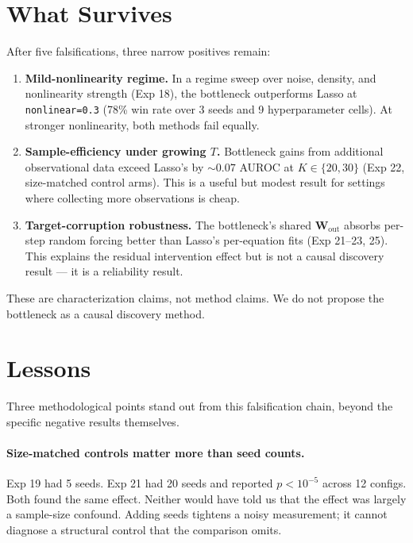 \documentclass{article}
\begin{document}
\section{What Survives}
\label{sec:survives}

After five falsifications, three narrow positives remain:

\begin{enumerate}[leftmargin=1.5em, topsep=0pt, itemsep=0pt]
  \item \textbf{Mild-nonlinearity regime.} In a regime sweep over
  noise, density, and nonlinearity strength (Exp 18), the bottleneck
  outperforms Lasso at \texttt{nonlinear=0.3} (78\% win rate over 3
  seeds and 9 hyperparameter cells). At stronger nonlinearity,
  both methods fail equally.
  \item \textbf{Sample-efficiency under growing $T$.} Bottleneck
  gains from additional observational data exceed Lasso's by
  $\sim 0.07$ AUROC at $K \in \{20, 30\}$ (Exp 22, size-matched
  control arms). This is a useful but modest result for settings
  where collecting more observations is cheap.
  \item \textbf{Target-corruption robustness.} The bottleneck's
  shared $\mathbf{W}_{\text{out}}$ absorbs per-step random
  forcing better than Lasso's per-equation fits (Exp 21--23, 25).
  This explains the residual intervention effect but is not a causal
  discovery result — it is a reliability result.
\end{enumerate}

These are characterization claims, not method claims. We do not
propose the bottleneck as a causal discovery method.

\section{Lessons}

Three methodological points stand out from this falsification chain,
beyond the specific negative results themselves.

\paragraph{Size-matched controls matter more than seed counts.}
Exp 19 had 5 seeds. Exp 21 had 20 seeds and reported $p < 10^{-5}$
across 12 configs. Both found the same effect. Neither would have
told us that the effect was largely a sample-size confound. Adding
seeds tightens a noisy measurement; it cannot diagnose a structural
control that the comparison omits.
\end{document}
